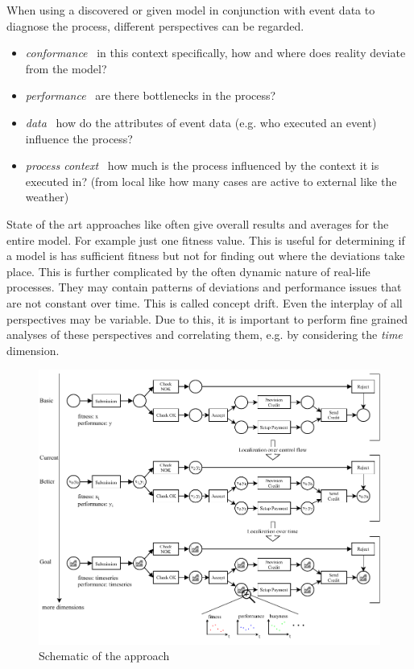 When using a discovered or given model in conjunction with event data to diagnose the process, different perspectives can be regarded.
\begin{itemize}
    \item \emph{conformance} \textemdash \ in this context specifically, how and where does reality deviate from the model?
    \item \emph{performance} \textemdash \ are there bottlenecks in the process?
    \item \emph{data} \textemdash \ how do the attributes of event data (e.g. who executed an event) influence the process?
    \item \emph{process context} \textemdash \ how much is the process influenced by the context it is executed in? (from local like how many cases are active to external like the weather) 
\end{itemize}
State of the art approaches like \cite{mannhardt2015multi} often give overall results and averages for the entire model. For example just one fitness value. This is useful for determining if a model is has sufficient fitness but not for finding out where the deviations take place.
This is further complicated by the often dynamic nature of real-life processes. They may contain patterns of deviations and performance issues that are not constant over time. This is called concept drift. Even the interplay of all perspectives may be variable. Due to this, it is important to perform fine grained analyses of these perspectives and correlating them, e.g. by considering the \emph{time} dimension.
\begin{figure}
    \centering
    \includegraphics[width=\textwidth]{figures/introduction/bigschematic_v3.pdf}
    \caption{Schematic of the approach}
    \label{fig:bigschematic}
\end{figure}

